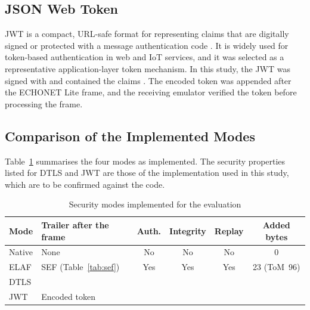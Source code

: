 \subsection{JSON Web Token}
\label{sec:i-jwt}

JWT is a compact, URL-safe format for representing claims that are digitally signed or protected with a message authentication code \citep{RFC7519}. It is widely used for token-based authentication in web and IoT services, and it was selected as a representative application-layer token mechanism. In this study, the JWT was signed with \tbd{} and contained the claims \tbd{}. The encoded token was appended after the ECHONET Lite frame, and the receiving emulator verified the token before processing the frame.

\subsection{Comparison of the Implemented Modes}

Table~\ref{tab:modes} summarises the four modes as implemented. The security properties listed for DTLS and JWT are those of the implementation used in this study, which are to be confirmed against the code.

\begin{table}[htbp]
  \centering
  \caption{Security modes implemented for the evaluation}
  \label{tab:modes}
  \footnotesize
  \renewcommand{\arraystretch}{1.2}
  \begin{tabularx}{\textwidth}{@{}l >{\raggedright\arraybackslash}X c c c c@{}}
    \toprule
    \textbf{Mode} & \textbf{Trailer after the frame} & \textbf{Auth.} & \textbf{Integrity} & \textbf{Replay} & \textbf{Added bytes} \\
    \midrule
    Native        & None                                   & No     & No     & No     & 0                     \\
    ELAF          & SEF (Table~\ref{tab:sef})              & Yes    & Yes    & Yes    & 23 (ToM~96)           \\
    DTLS          & \tbd{}                                 & \tbd{} & \tbd{} & \tbd{} & \tbd{}                \\
    JWT           & Encoded token \tbd{}                   & \tbd{} & \tbd{} & \tbd{} & \tbd{}                \\
    \bottomrule
  \end{tabularx}
\end{table}

